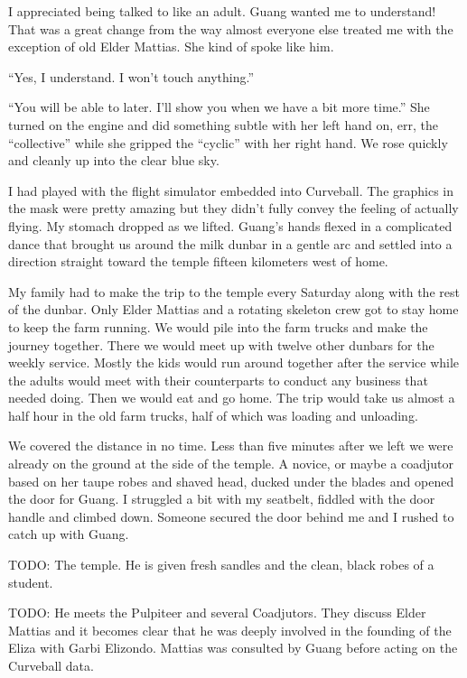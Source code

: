 I appreciated being talked to like an adult. Guang wanted me to understand! That was a great change from the way almost everyone else treated me with the exception of old Elder Mattias. She kind of spoke like him.

``Yes, I understand. I won't touch anything.''

``You will be able to later. I'll show you when we have a bit more time.'' She turned on the engine and did something subtle with her left hand on, err, the ``collective'' while she gripped the ``cyclic'' with her right hand. We rose quickly and cleanly up into the clear blue sky.

I had played with the flight simulator embedded into Curveball. The graphics in the mask were pretty amazing but they didn't fully convey the feeling of actually flying. My stomach dropped as we lifted. Guang's hands flexed in a complicated dance that brought us around the milk dunbar in a gentle arc and settled into a direction straight toward the temple fifteen kilometers west of home.

My family had to make the trip to the temple every Saturday along with the rest of the dunbar. Only Elder Mattias and a rotating skeleton crew got to stay home to keep the farm running. We would pile into the farm trucks and make the journey together. There we would meet up with twelve other dunbars for the weekly service. Mostly the kids would run around together after the service while the adults would meet with their counterparts to conduct any business that needed doing. Then we would eat and go home. The trip would take us almost a half hour in the old farm trucks, half of which was loading and unloading.

We covered the distance in no time. Less than five minutes after we left we were already on the ground at the side of the temple. A novice, or maybe a coadjutor based on her taupe robes and shaved head, ducked under the blades and opened the door for Guang. I struggled a bit with my seatbelt, fiddled with the door handle and climbed down. Someone secured the door behind me and I rushed to catch up with Guang.

TODO: The temple. He is given fresh sandles and the clean, black robes of a student.

TODO: He meets the Pulpiteer and several Coadjutors. They discuss Elder Mattias and it becomes clear that he was deeply involved in the founding of the Eliza with Garbi Elizondo. Mattias was consulted by Guang before acting on the Curveball data.

\newpage
\thispagestyle{empty}

